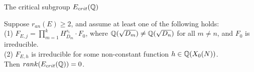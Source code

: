 \documentclass[handout]{beamer}
\begin{document}
\begin{frame}{The critical subgroup $E_{crit}(\mathbb{Q})$}
\smallskip
\pause




\begin{Theorem}[C.]
\label{cor: cm}
Suppose $r_{an}(E) \geq 2$, and assume at least one of the following holds: \\
(1) $F_{E,j} = \prod_{m =1}^k H_{D_m}^{s_i}\cdot F_0$, where 
$\mathbb{Q}(\sqrt{D_m}) \neq \mathbb{Q}(\sqrt{D_n})$ for all $m\neq n$, and $F_0$ is irreducible. \\
(2) $F_{E,h}$ is irreducible for some non-constant function $h \in \mathbb{Q}(X_0(N))$. \\
Then $rank(E_{crit}(\mathbb{Q}))  = 0$. 
\end{Theorem}
\end{frame}


\end{document}
